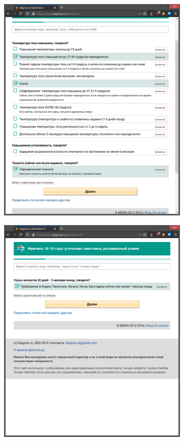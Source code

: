 \documentclass[
  a4paper,
  oneside,
  BCOR = 10mm,
  DIV = 12,
  12pt,
  headings = normal,
]{scrartcl}
\newlength{\gridunitwidth}
\begin{document}
\begin{figure}[!htbp]
\begin{subfigure}[b]{6 \gridunitwidth - 1em /2}
          \includegraphics[width = \columnwidth]{./assets/07.png}
          \caption{}
          \label{subfig:diagnos-ru-02}
        \end{subfigure}
        \begin{subfigure}[b]{6 \gridunitwidth - 1em /2}
          \includegraphics[width = \columnwidth]{./assets/09.png}

\end{subfigure}
\end{figure}
\end{document}
